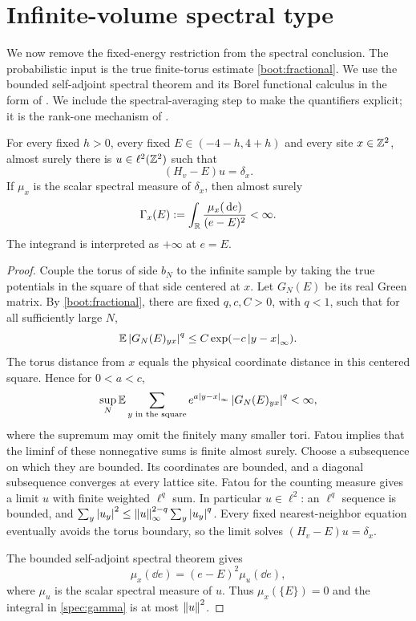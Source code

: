 \section{Infinite-volume spectral type}
\label{sec:spectral}

We now remove the fixed-energy restriction from the spectral conclusion.
The probabilistic input is the true finite-torus estimate
\cref{boot:fractional}. We use the bounded self-adjoint spectral theorem
and its Borel functional calculus in the form of
\cite[Theorems~3.1 and~3.7]{Teschl2009}. We include the spectral-averaging
step to make the quantifiers explicit; it is the rank-one mechanism of
\cite[Theorem~2', Proposition~7 and Theorem~8(i)]{SimonWolff1986}.

\begin{lemma}\label{spec:column}
For every fixed $h>0$, every fixed $E\in(-4-h,4+h)$ and every site
$x\in\mathbb Z^2$, almost surely there is $u\in\ell^2(\mathbb Z^2)$ such that
\[
 (H_v-E)u=\delta_x.
\]
If $\mu_x$ is the scalar spectral measure of $\delta_x$, then almost
surely
\begin{equation}\label{spec:gamma}
 \Gamma_x(E):=\int_\mathbb R\frac{\mu_x(\,\mathrm d e)}{(e-E)^2}<\infty.
\end{equation}
The integrand is interpreted as $+\infty$ at $e=E$.
\end{lemma}

\begin{proof}
Couple the torus of side $b_N$ to the infinite sample by taking the true
potentials in the square of that side centered at $x$. Let $G_N(E)$ be
its real Green matrix. By \cref{boot:fractional}, there are fixed
$q,c,C>0$, with $q<1$, such that for all sufficiently large $N$,
\[
 \mathbb E\left\lvert G_N(E)_{yx}\right\rvert^q\le C\exp(-c\left\lvert y-x\right\rvert_\infty).
\]
The torus distance from $x$ equals the physical coordinate distance in
this centered square. Hence for $0<a<c$,
\[
 \sup_N\mathbb E\sum_{y\text{ in the square}}
 e^{a\left\lvert y-x\right\rvert_\infty}\left\lvert G_N(E)_{yx}\right\rvert^q<\infty,
\]
where the supremum may omit the finitely many smaller tori.
Fatou implies that the liminf of these nonnegative sums is finite
almost surely. Choose a subsequence on which they are bounded. Its
coordinates are bounded, and a diagonal subsequence converges at every
lattice site. Fatou for the counting measure gives a limit $u$ with
finite weighted $\ell^q$ sum. In particular $u\in\ell^2$: an $\ell^q$
sequence is bounded, and
$\sum_y\left\lvert u_y\right\rvert^2\le\left\lVert u\right\rVert_\infty^{2-q}\sum_y\left\lvert u_y\right\rvert^q$.
Every fixed nearest-neighbor equation eventually avoids the torus
boundary, so the limit solves $(H_v-E)u=\delta_x$.

The bounded self-adjoint spectral theorem gives
\[
 \mu_x(\dd e)=(e-E)^2\mu_u(\dd e),
\]
where $\mu_u$ is the scalar spectral measure of $u$. Thus
$\mu_x(\{E\})=0$ and the integral in \cref{spec:gamma} is at most
$\left\lVert u\right\rVert^2$.
\end{proof}

